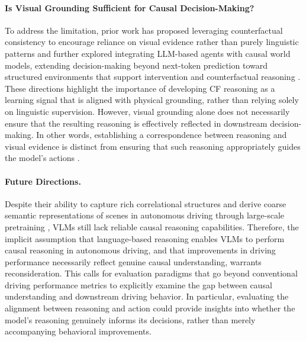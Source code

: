 \documentclass{article}
\begin{document}
\paragraph{Is Visual Grounding Sufficient for Causal Decision-Making?} To address the limitation, prior work has proposed leveraging counterfactual consistency to encourage reliance on visual evidence rather than purely linguistic patterns \cite{causal:defacto} and further explored integrating LLM-based agents with causal world models, extending decision-making beyond next-token prediction toward structured environments that support intervention and counterfactual reasoning \cite{causal:bridging_llms_and_causal_world_model}. These directions highlight the importance of developing CF reasoning as a learning signal that is aligned with physical grounding, rather than relying solely on linguistic supervision. However, visual grounding alone does not necessarily ensure that the resulting reasoning is effectively reflected in downstream decision-making. In other words, establishing a correspondence between reasoning and visual evidence is distinct from ensuring that such reasoning appropriately guides the model's actions \cite{causal:e2e-vlm:grounding_shapes_plan,robotics:linking_causal_to_gen_in_vla}.

\paragraph{Future Directions.}
Despite their ability to capture rich correlational structures and derive coarse semantic representations of scenes in autonomous driving through large-scale pretraining \cite{causal:e2e-vlm:from_representational}, VLMs still lack reliable causal reasoning capabilities. Therefore, the implicit assumption that language-based reasoning enables VLMs to perform causal reasoning in autonomous driving, and that improvements in driving performance necessarily reflect genuine causal understanding, warrants reconsideration. This calls for evaluation paradigms that go beyond conventional driving performance metrics to explicitly examine the gap between causal understanding and downstream driving behavior. In particular, evaluating the alignment between reasoning and action could provide insights into whether the model's reasoning genuinely informs its decisions, rather than merely accompanying behavioral improvements.
\end{document}
